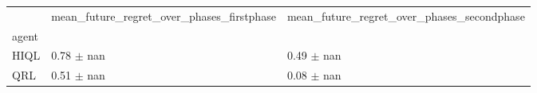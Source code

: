\begin{tabular}{lll}
\toprule
 & mean_future_regret_over_phases_firstphase & mean_future_regret_over_phases_secondphase \\
agent &  &  \\
\midrule
HIQL & 0.78 $\pm$ nan & 0.49 $\pm$ nan \\
QRL & 0.51 $\pm$ nan & 0.08 $\pm$ nan \\
\bottomrule
\end{tabular}
